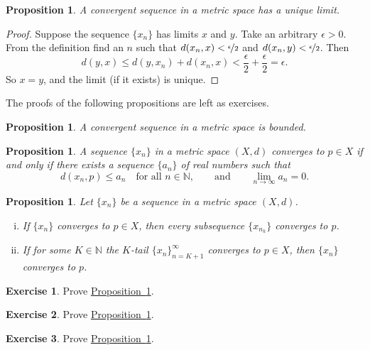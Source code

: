 \documentclass[12pt,openany]{book}
\newcommand{\N}{{\mathbb{N}}}
\theoremstyle{plain}
\newtheorem{prop}[thm]{Proposition}
\theoremstyle{remark}
\theoremstyle{definition}
\newenvironment{exbox}{%
    \def\FrameCommand{\vrule width 1pt \relax\hspace{10pt}}%
    \MakeFramed{\advance\hsize-\width\FrameRestore}%
}{%
    \endMakeFramed
}
\theoremstyle{exercise}
\newtheorem{exercise}{Exercise}[section]
\theoremstyle{example}
\newcommand{\propref}[1]{\hyperref[#1]{Proposition~\ref*{#1}}}
\begin{document}
\begin{prop} \label{prop:mslimisunique}
A convergent sequence in a metric space has a unique limit.
\end{prop}

\begin{proof}
Suppose the sequence $\{ x_n \}$ has limits $x$ and $y$.
Take an arbitrary $\epsilon > 0$.
From the definition find an $n$ such that 
$d(x_n,x) < \nicefrac{\epsilon}{2}$ and
$d(x_n,y) < \nicefrac{\epsilon}{2}$.  Then
\begin{equation*}
d(y,x)
\leq
d(y,x_n) + d(x_n,x)
<
\frac{\epsilon}{2} + \frac{\epsilon}{2} = \epsilon .
\end{equation*}
So $x=y$, and the limit (if it exists) is unique.
\end{proof}

The proofs of the following propositions are left as exercises.

\begin{prop} \label{prop:msconvbound}
A convergent sequence in a metric space is bounded.
\end{prop}

\begin{prop} \label{prop:msconvifa}
A sequence $\{ x_n \}$ in a metric space $(X,d)$ converges to $p \in X$
if and only
if there exists a sequence $\{ a_n \}$ of real numbers such that
\begin{equation*}
d(x_n,p) \leq a_n \quad \text{for all } n \in \N,
\qquad \text{and} \qquad
\lim_{n\to\infty} a_n = 0.
\end{equation*}
\end{prop}

\begin{prop} \label{prop:mssubseq}
Let $\{ x_n \}$ be a sequence in a metric space $(X,d)$.
\begin{enumerate}[(i)]
\item If $\{ x_n \}$ converges to $p \in X$, then every subsequence $\{ x_{n_k} \}$
converges to $p$.
\item If for some $K \in \N$ the $K$-tail $\{ x_n \}_{n=K+1}^\infty$
converges to $p \in X$, then
 $\{ x_n \}$ converges to $p$.
\end{enumerate}
\end{prop}

\begin{exbox}
\begin{exercise}
Prove \propref{prop:msconvbound}.
\end{exercise}

\begin{exercise}
Prove \propref{prop:msconvifa}.
\end{exercise}

\begin{exercise}
Prove \propref{prop:mssubseq}.
\end{exercise}
\end{exbox}
\end{document}
